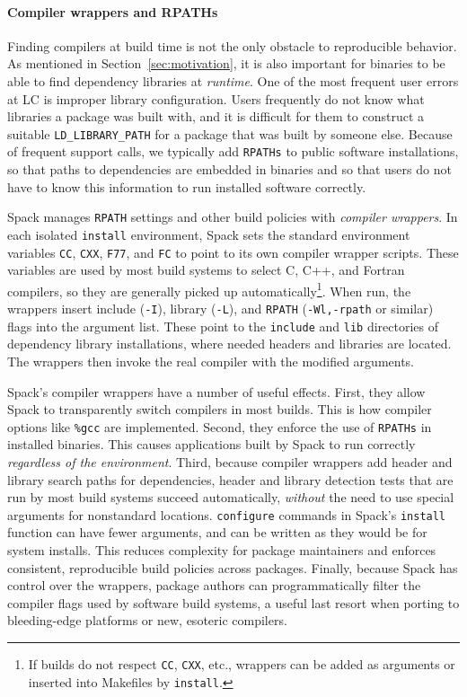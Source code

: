 \paragraph{Compiler wrappers and RPATHs}
Finding compilers at build time is not the only obstacle to reproducible
behavior.  As mentioned in Section~\ref{sec:motivation}, it is also important
for binaries to be able to find dependency libraries at {\it runtime}.
One of the most frequent user errors at LC is improper library configuration.
Users frequently do not know what libraries a package was built with, and 
it is difficult for them to construct a suitable {\tt LD\_LIBRARY\_PATH} for
a package that was built by someone else.  Because of frequent support calls,
we typically add {\tt RPATHs} to public software installations, so that paths
to dependencies are embedded in binaries and so that users do not have to know
this information to run installed software correctly.

Spack manages {\tt RPATH} settings and other build policies with
{\it compiler wrappers}. 
In each isolated {\tt install} environment, Spack sets the standard 
environment variables
{\tt CC}, {\tt CXX}, {\tt F77}, and {\tt FC} to point to its own compiler
wrapper scripts.  These variables are used by most build systems to select
C, C++, and Fortran compilers, so they are generally picked up 
automatically\footnote{If builds do not respect {\tt CC}, {\tt CXX}, etc.,
wrappers can be added as arguments or inserted into Makefiles
by {\tt install}.}.
When run, the wrappers insert include ({\tt -I}), library ({\tt -L}), and 
{\tt RPATH} ({\tt -Wl,-rpath} or similar) flags into the argument list.
These point to the {\tt include} and {\tt lib} directories of dependency
library installations, where needed headers and libraries are located.
The wrappers then invoke the real compiler with the modified arguments.

Spack's compiler wrappers have a number of useful effects.  First, they allow
Spack to transparently switch compilers in most builds.  This is how
compiler options like {\tt \%gcc} are implemented.  Second, they enforce the
use of {\tt RPATHs} in
installed binaries.  This causes applications built by Spack to run correctly
{\it regardless of the environment}.  Third, because compiler wrappers add 
header and library search paths for dependencies, header and library detection
tests that are run by most build systems succeed automatically, {\it without}
the need to use special arguments for nonstandard locations.  {\tt configure}
commands in Spack's {\tt install} function can have fewer arguments, and can
be written as they would be for system installs.  This reduces complexity
for package maintainers and enforces consistent, reproducible
build policies across packages.  Finally, because Spack has control over the 
wrappers, package authors can programmatically filter the compiler flags
used by software build systems, a useful last resort when porting to
bleeding-edge platforms or new, esoteric compilers.

